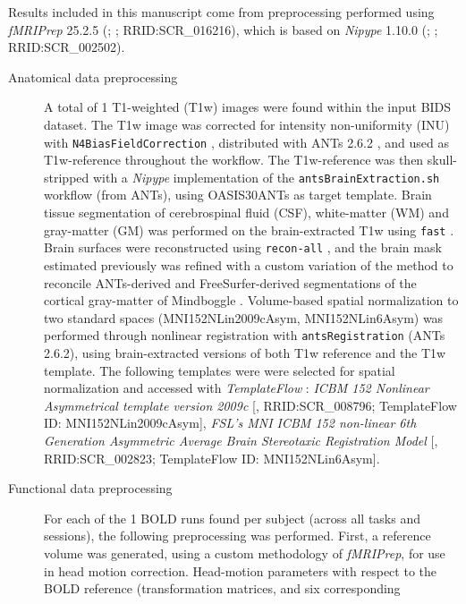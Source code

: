 \documentclass[
]{article}
\author{}
\date{}
\begin{document}
Results included in this manuscript come from preprocessing performed
using \emph{fMRIPrep} 25.2.5 (\citet{fmriprep1}; \citet{fmriprep2};
RRID:SCR\_016216), which is based on \emph{Nipype} 1.10.0
(\citet{nipype1}; \citet{nipype2}; RRID:SCR\_002502).

\begin{description}
\item[Anatomical data preprocessing]
A total of 1 T1-weighted (T1w) images were found within the input BIDS
dataset. The T1w image was corrected for intensity non-uniformity (INU)
with \texttt{N4BiasFieldCorrection} \citep{n4}, distributed with ANTs
2.6.2 \citep[RRID:SCR\_004757]{ants}, and used as T1w-reference
throughout the workflow. The T1w-reference was then skull-stripped with
a \emph{Nipype} implementation of the \texttt{antsBrainExtraction.sh}
workflow (from ANTs), using OASIS30ANTs as target template. Brain tissue
segmentation of cerebrospinal fluid (CSF), white-matter (WM) and
gray-matter (GM) was performed on the brain-extracted T1w using
\texttt{fast} \citep[FSL (version unknown),
RRID:SCR\_002823,][]{fsl_fast}. Brain surfaces were reconstructed using
\texttt{recon-all} \citep[FreeSurfer 7.3.2,
RRID:SCR\_001847,][]{fs_reconall}, and the brain mask estimated
previously was refined with a custom variation of the method to
reconcile ANTs-derived and FreeSurfer-derived segmentations of the
cortical gray-matter of Mindboggle
\citep[RRID:SCR\_002438,][]{mindboggle}. Volume-based spatial
normalization to two standard spaces (MNI152NLin2009cAsym,
MNI152NLin6Asym) was performed through nonlinear registration with
\texttt{antsRegistration} (ANTs 2.6.2), using brain-extracted versions
of both T1w reference and the T1w template. The following templates were
were selected for spatial normalization and accessed with
\emph{TemplateFlow} \citep[25.0.4,][]{templateflow}: \emph{ICBM 152
Nonlinear Asymmetrical template version 2009c}
{[}\citet{mni152nlin2009casym}, RRID:SCR\_008796; TemplateFlow ID:
MNI152NLin2009cAsym{]}, \emph{FSL's MNI ICBM 152 non-linear 6th
Generation Asymmetric Average Brain Stereotaxic Registration Model}
{[}\citet{mni152nlin6asym}, RRID:SCR\_002823; TemplateFlow ID:
MNI152NLin6Asym{]}.
\item[Functional data preprocessing]
For each of the 1 BOLD runs found per subject (across all tasks and
sessions), the following preprocessing was performed. First, a reference
volume was generated, using a custom methodology of \emph{fMRIPrep}, for
use in head motion correction. Head-motion parameters with respect to
the BOLD reference (transformation matrices, and six corresponding

\end{description}
\end{document}
